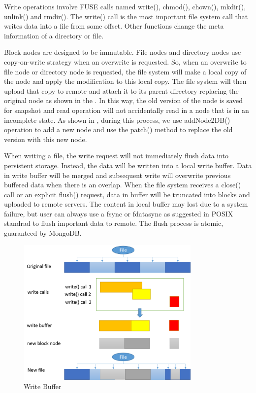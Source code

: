     Write operations involve FUSE calls named write(), chmod(), chown(), mkdir(), unlink() and rmdir(). The write() call is the most important file system call that writes data into a file from some offset. Other functions change the meta information of a directory or file.

    Block nodes are designed to be immutable. File nodes and directory nodes use copy-on-write strategy when an overwrite is requested. So, when an overwrite to file node or directory node is requested, the file system will make a local copy of the node and apply the modification to this local copy. The file system will then upload that copy to remote and attach it to its parent directory replacing the original node as shown in the . In this way, the old version of the node is saved for snapshot and read operation will not accidentally read in a node that is in an incomplete state. As shown in , during this process, we use addNode2DB() operation to add a new node and use the patch() method to replace the old version with this new node.

	When writing a file, the write request will not immediately flush data into persistent storage. Instead, the data will be written into a local write buffer. Data in write buffer will be merged and subsequent write will overwrite previous buffered data when there is an overlap. When the file system receives a close() call or an explicit flush() request, data in buffer will be truncated into blocks and uploaded to remote servers. The content in local buffer may lost due to a system failure, but user can always use a fsync or fdatasync as suggested in POSIX standrad to flush important data to remote. The flush process is atomic, guaranteed by MongoDB. 

\begin{figure}[hbtp]
\centering
\includegraphics[width=0.8\textwidth]{Chapter-3/figs/fig11.png}
\caption{Write Buffer}
\label{fig:buffer}
\end{figure}

